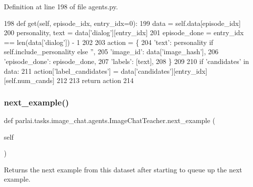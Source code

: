 Definition at line 198 of file agents.\+py.


\begin{DoxyCode}
198     \textcolor{keyword}{def }get(self, episode\_idx, entry\_idx=0):
199         data = self.data[episode\_idx]
200         personality, text = data[\textcolor{stringliteral}{'dialog'}][entry\_idx]
201         episode\_done = entry\_idx == len(data[\textcolor{stringliteral}{'dialog'}]) - 1
202 
203         action = \{
204             \textcolor{stringliteral}{'text'}: personality \textcolor{keywordflow}{if} self.include\_personality \textcolor{keywordflow}{else} \textcolor{stringliteral}{''},
205             \textcolor{stringliteral}{'image\_id'}: data[\textcolor{stringliteral}{'image\_hash'}],
206             \textcolor{stringliteral}{'episode\_done'}: episode\_done,
207             \textcolor{stringliteral}{'labels'}: [text],
208         \}
209 
210         \textcolor{keywordflow}{if} \textcolor{stringliteral}{'candidates'} \textcolor{keywordflow}{in} data:
211             action[\textcolor{stringliteral}{'label\_candidates'}] = data[\textcolor{stringliteral}{'candidates'}][entry\_idx][self.num\_cands]
212 
213         \textcolor{keywordflow}{return} action
214 
\end{DoxyCode}
\mbox{\label{classparlai_1_1tasks_1_1image__chat_1_1agents_1_1ImageChatTeacher_a2b795770610618bf94e76705cb90611a}} 
\subsubsection{\texorpdfstring{next\+\_\+example()}{next\_example()}}
{\footnotesize\ttfamily def parlai.\+tasks.\+image\+\_\+chat.\+agents.\+Image\+Chat\+Teacher.\+next\+\_\+example (\begin{DoxyParamCaption}\item[{}]{self }\end{DoxyParamCaption})}

\begin{DoxyVerb}Returns the next example from this dataset after starting to queue up the next
example.
\end{DoxyVerb}
 


